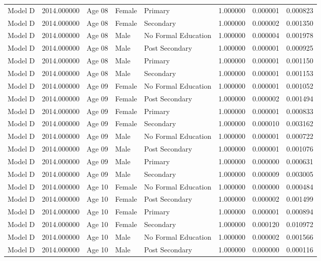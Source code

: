 \begin{table}[ht]
\begin{tabular}{lrlllrrr}
Model D & 2014.000000 & Age 08 & Female & Primary & 1.000000 & 0.000001 & 0.000823 \\
Model D & 2014.000000 & Age 08 & Female & Secondary & 1.000000 & 0.000002 & 0.001350 \\
Model D & 2014.000000 & Age 08 & Male & No Formal Education & 1.000000 & 0.000004 & 0.001978 \\
Model D & 2014.000000 & Age 08 & Male & Post Secondary & 1.000000 & 0.000001 & 0.000925 \\
Model D & 2014.000000 & Age 08 & Male & Primary & 1.000000 & 0.000001 & 0.001150 \\
Model D & 2014.000000 & Age 08 & Male & Secondary & 1.000000 & 0.000001 & 0.001153 \\
Model D & 2014.000000 & Age 09 & Female & No Formal Education & 1.000000 & 0.000001 & 0.001052 \\
Model D & 2014.000000 & Age 09 & Female & Post Secondary & 1.000000 & 0.000002 & 0.001494 \\
Model D & 2014.000000 & Age 09 & Female & Primary & 1.000000 & 0.000001 & 0.000833 \\
Model D & 2014.000000 & Age 09 & Female & Secondary & 1.000000 & 0.000010 & 0.003162 \\
Model D & 2014.000000 & Age 09 & Male & No Formal Education & 1.000000 & 0.000001 & 0.000722 \\
Model D & 2014.000000 & Age 09 & Male & Post Secondary & 1.000000 & 0.000001 & 0.001076 \\
Model D & 2014.000000 & Age 09 & Male & Primary & 1.000000 & 0.000000 & 0.000631 \\
Model D & 2014.000000 & Age 09 & Male & Secondary & 1.000000 & 0.000009 & 0.003005 \\
Model D & 2014.000000 & Age 10 & Female & No Formal Education & 1.000000 & 0.000000 & 0.000484 \\
Model D & 2014.000000 & Age 10 & Female & Post Secondary & 1.000000 & 0.000002 & 0.001499 \\
Model D & 2014.000000 & Age 10 & Female & Primary & 1.000000 & 0.000001 & 0.000894 \\
Model D & 2014.000000 & Age 10 & Female & Secondary & 1.000000 & 0.000120 & 0.010972 \\
Model D & 2014.000000 & Age 10 & Male & No Formal Education & 1.000000 & 0.000002 & 0.001566 \\
Model D & 2014.000000 & Age 10 & Male & Post Secondary & 1.000000 & 0.000000 & 0.000116 \\

\end{tabular}
\end{table}
